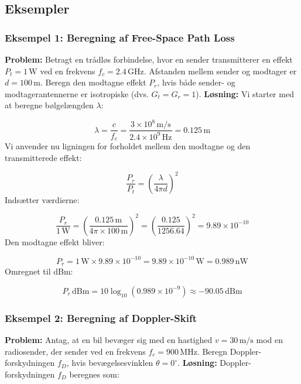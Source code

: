 \documentclass[a4paper,12pt]{book}
\begin{document}
	\subsection{Eksempler}
	\subsubsection{Eksempel 1: Beregning af Free-Space Path Loss}
	\textbf{Problem:} Betragt en trådløs forbindelse, hvor en sender transmitterer en effekt \( P_t = 1 \, \text{W} \) ved en frekvens \( f_c = 2.4 \, \text{GHz} \). Afstanden mellem sender og modtager er \( d = 100 \, \text{m} \). Beregn den modtagne effekt \( P_r \), hvis både sender- og modtagerantennerne er isotropiske (dvs. \( G_t = G_r = 1 \)).
	\newline\newline\noindent
	\textbf{Løsning:}
	Vi starter med at beregne bølgelængden \( \lambda \):
	
	\[
	\lambda = \frac{c}{f_c} = \frac{3 \times 10^8 \, \text{m/s}}{2.4 \times 10^9 \, \text{Hz}} = 0.125 \, \text{m}
	\]
	\noindent
	Vi anvender nu ligningen for forholdet mellem den modtagne og den transmitterede effekt:
	
	\[
	\frac{P_r}{P_t} = \left( \frac{\lambda}{4\pi d} \right)^2
	\]
	\noindent
	Indsætter værdierne:
	
	\[
	\frac{P_r}{1 \, \text{W}} = \left( \frac{0.125 \, \text{m}}{4\pi \times 100 \, \text{m}} \right)^2 = \left( \frac{0.125}{1256.64} \right)^2 = 9.89 \times 10^{-10}
	\]
	\noindent
	Den modtagne effekt bliver:
	
	\[
	P_r = 1 \, \text{W} \times 9.89 \times 10^{-10} = 9.89 \times 10^{-10} \, \text{W} = 0.989 \, \text{nW}
	\]
	\noindent
	Omregnet til dBm:
	
	\[
	P_r \, \text{dBm} = 10 \log_{10}(0.989 \times 10^{-9}) \approx -90.05 \, \text{dBm}
	\]
	
	\subsubsection{Eksempel 2: Beregning af Doppler-Skift}
	\textbf{Problem:} Antag, at en bil bevæger sig med en hastighed \( v = 30 \, \text{m/s} \) mod en radiosender, der sender ved en frekvens \( f_c = 900 \, \text{MHz} \). Beregn Doppler-forskydningen \( f_D \), hvis bevægelsesvinklen \( \theta = 0^\circ \).
	\newline\newline\noindent
	\textbf{Løsning:}
	Doppler-forskydningen \( f_D \) beregnes som:
	
\end{document}
